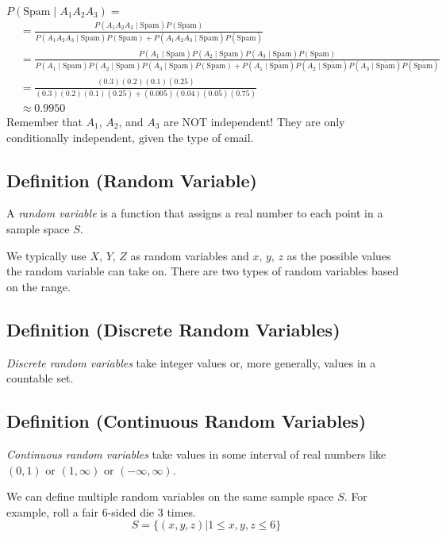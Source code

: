 $ P(\text{Spam}\mid A_1A_2A_3)= $
\begin{align*}
    &=\frac{P(A_1A_2A_3\mid\text{Spam})P(\text{Spam})}
    {P(A_1A_2A_3\mid\text{Spam})P(\text{Spam})+
    P(A_1A_2A_3\mid\overline{\text{Spam}})P(\overline{\text{Spam}})}\\
    &=\frac{P(A_1\mid\text{Spam}) P(A_2\mid\text{Spam}) P(A_3\mid\text{Spam}) P(\text{Spam})}
    {P(A_1\mid\text{Spam}) P(A_2\mid\text{Spam}) P(A_3\mid\text{Spam})P(\text{Spam})+
    P(A_1\mid\overline{\text{Spam}}) P(A_2\mid\overline{\text{Spam}}) P(A_3\mid\overline{\text{Spam}})P(\overline{\text{Spam}})}\\
    &=\frac{(0.3)(0.2)(0.1)(0.25)}{(0.3)(0.2)(0.1)(0.25)+(0.005)(0.04)(0.05)(0.75)} \\
    &\approx 0.9950
\end{align*}
Remember that $ A_1 $, $ A_2 $, and $ A_3 $ are NOT independent!
They are only conditionally independent, given the type of email.

\textbf{}

\begin{defbox}
    \subsection{Definition (Random Variable)}
    A \emph{random variable} is a function that assigns a real number to each point in
    a sample space $S$.
\end{defbox}
We typically use $ X,\,Y,\,Z $ as random variables and $ x,\,y,\,z $ as the
possible values the random variable can take on. There are two types
of random variables based on the range.
\begin{defbox}
    \subsection{Definition (Discrete Random Variables)}
    \emph{Discrete random variables} take integer values or, more generally, values in a
    countable set.
\end{defbox}
\begin{defbox}
    \subsection{Definition (Continuous Random Variables)}
    \emph{Continuous random variables} take values in some interval of real numbers
    like $(0,1)$ or $(1,\infty)$ or $ (-\infty,\infty) $.
\end{defbox}
We can define multiple random variables on the same sample space $ S $. For example,
roll a fair $ 6 $-sided die $ 3 $ times.
\[ S=\{(x,y,z)|1\le x, y, z\le 6\} \]

